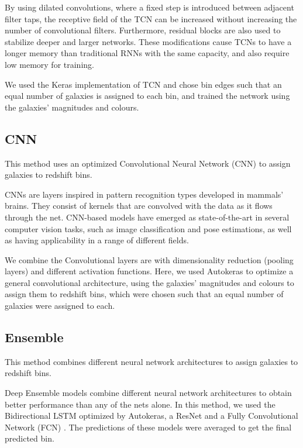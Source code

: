 \documentclass[twocolumn,twocolappendix]{aastex63}
\begin{document}
By using dilated convolutions, where a fixed step is introduced between adjacent filter taps, the
receptive field of the TCN can be increased without increasing the number of convolutional filters.
Furthermore, residual blocks \citep{he} are also used to stabilize deeper and larger networks. These
modifications cause TCNs to have a longer memory than traditional RNNs with the same capacity,  and
also require low memory for training.
 
We used the Keras implementation of TCN \citep{kerastcn} and chose bin edges such that an equal
number of galaxies is assigned to each bin, and trained the network using the galaxies' magnitudes
and colours. 

\subsection{ {\sc CNN} } 
This method uses an optimized Convolutional Neural Network (CNN) to assign
galaxies to redshift bins. 
 
CNNs \citep{lecun2015deep} are layers inspired in pattern recognition types developed in mammals' brains.
They consist of kernels that are convolved with the data as it flows through the net. CNN-based
models have emerged as state-of-the-art in several computer vision tasks, such as image
classification and pose estimations, as well as having applicability in a range of different fields.
 
We combine the Convolutional layers are with dimensionality reduction (pooling layers) and different
activation functions. Here, we used Autokeras to optimize a general convolutional architecture,
using the galaxies' magnitudes and colours to assign them to redshift bins, which were chosen such
that an equal number of galaxies were assigned to each.


\subsection{ {\sc Ensemble} } 
\label{ClecioEnsemble} 
This method combines different neural network
architectures to assign galaxies to redshift bins.
 
Deep Ensemble models combine different neural network architectures to obtain better performance
than any of the nets alone. In this method, we used the Bidirectional LSTM optimized by Autokeras, a
ResNet \citep{resnet} and a Fully Convolutional Network (FCN) \citep{fcn}. The predictions of these
models were averaged to get the final predicted bin. 
 
\end{document}
